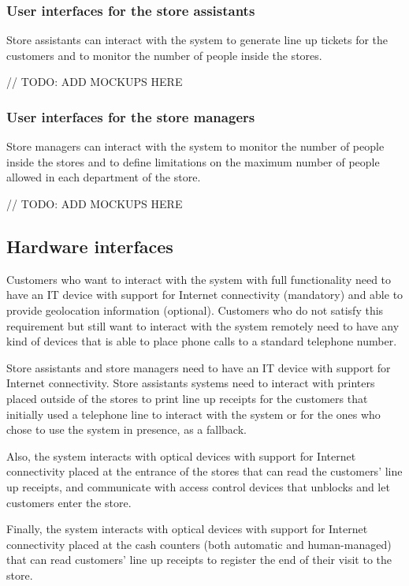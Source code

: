 \documentclass[../../main.tex]{subfiles}
\begin{document}
  \subsubsection{User interfaces for the store assistants}

  Store assistants can interact with the system to generate line up tickets for the customers and to monitor the number of people inside the stores.

  // TODO: ADD MOCKUPS HERE

  \subsubsection{User interfaces for the store managers}

  Store managers can interact with the system to monitor the number of people inside the stores and to define limitations on the maximum number of people allowed in each department of the store.

  // TODO: ADD MOCKUPS HERE

\subsection{Hardware interfaces}

Customers who want to interact with the system with full functionality need to have an IT device with support for Internet connectivity (mandatory) and able to provide geolocation information (optional). Customers who do not satisfy this requirement but still want to interact with the system remotely need to have any kind of devices that is able to place phone calls to a standard telephone number.

Store assistants and store managers need to have an IT device with support for Internet connectivity. Store assistants systems need to interact with printers placed outside of the stores to print line up receipts for the customers that initially used a telephone line to interact with the system or for the ones who chose to use the system in presence, as a fallback.

Also, the system interacts with optical devices with support for Internet connectivity placed at the entrance of the stores that can read the customers' line up receipts, and communicate with access control devices that unblocks and let customers enter the store.

Finally, the system interacts with optical devices with support for Internet connectivity placed at the cash counters (both automatic and human-managed) that can read customers' line up receipts to register the end of their visit to the store.
\end{document}
